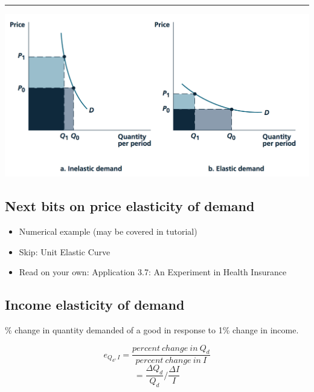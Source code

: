 \documentclass[]{article}
\providecommand{\tightlist}{%
  \setlength{\itemsep}{0pt}\setlength{\parskip}{0pt}}
\begin{document}
\begin{center}\rule{0.5\linewidth}{\linethickness}\end{center}

\includegraphics{picsfigs/elast_revenue.png}\\

\hypertarget{next-bits-on-price-elasticity-of-demand}{%
\subsection{Next bits on price elasticity of
demand}\label{next-bits-on-price-elasticity-of-demand}}

\begin{itemize}
\tightlist
\item
  Numerical example (may be covered in tutorial)
\item
  Skip: Unit Elastic Curve
\item
  Read on your own: Application 3.7: An Experiment in Health Insurance
\end{itemize}

\hypertarget{income-elasticity-of-demand}{%
\subsection{Income elasticity of
demand}\label{income-elasticity-of-demand}}

\begin{description}
\tightlist
\item[Income elasticity of demand]
\% change in quantity demanded of a good in response to 1\% change in
income.
\end{description}

\[e_{Q_d,I} = \frac{percent \ change \ in \ Q_d}{percent \ change \ in \  I} \]
\[  = \frac{\Delta Q_d}{Q_d}/\frac{\Delta I}{I}\]\\
\end{document}
